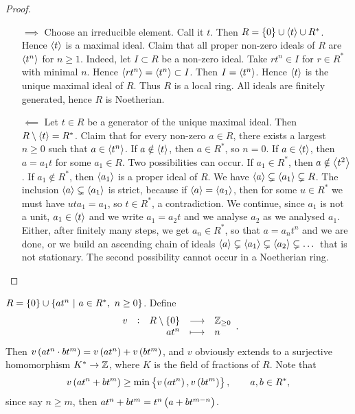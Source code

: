 \begin{proof}
\hfill
\begin{itemize}
\item[$ \implies $] Choose an irreducible element. Call it $ t $. Then $ R = \cbr{0} \cup \abr{t} \cup R^* $. Hence $ \left\langle t \right\rangle $ is a maximal ideal. Claim that all proper non-zero ideals of $ R $ are $ \left\langle t^n \right\rangle $ for $ n \ge 1 $. Indeed, let $ I \subset R $ be a non-zero ideal. Take $ rt^n \in I $ for $ r \in R^* $ with minimal $ n $. Hence $ \left\langle rt^n \right\rangle = \left\langle t^n \right\rangle \subset I $. Then $ I = \left\langle t^n \right\rangle $. Hence $ \left\langle t \right\rangle $ is the unique maximal ideal of $ R $. Thus $ R $ is a local ring. All ideals are finitely generated, hence $ R $ is Noetherian.


\item[$ \impliedby $] Let $ t \in R $ be a generator of the unique maximal ideal. Then $ R \setminus \left\langle t \right\rangle = R^* $. Claim that for every non-zero $ a \in R $, there exists a largest $ n \ge 0 $ such that $ a \in \left\langle t^n \right\rangle $. If $ a \notin \left\langle t \right\rangle $, then $ a \in R^* $, so $ n = 0 $. If $ a \in \left\langle t \right\rangle $, then $ a = a_1t $ for some $ a_1 \in R $. Two possibilities can occur. If $ a_1 \in R^* $, then $ a \notin \left\langle t^2 \right\rangle $. If $ a_1 \notin R^* $, then $ \left\langle a_1 \right\rangle $ is a proper ideal of $ R $. We have $ \left\langle a \right\rangle \subsetneq \left\langle a_1 \right\rangle \subsetneq R $. The inclusion $ \left\langle a \right\rangle \subsetneq \left\langle a_1 \right\rangle $ is strict, because if $ \left\langle a \right\rangle = \left\langle a_1 \right\rangle $, then for some $ u \in R^* $ we must have $ uta_1 = a_1 $, so $ t \in R^* $, a contradiction. We continue, since $ a_1 $ is not a unit, $ a_1 \in \left\langle t \right\rangle $ and we write $ a_1 = a_2t $ and we analyse $ a_2 $ as we analysed $ a_1 $. Either, after finitely many steps, we get $ a_n \in R^* $, so that $ a = a_nt^n $ and we are done, or we build an ascending chain of ideals $ \left\langle a \right\rangle \subsetneq \left\langle a_1 \right\rangle \subsetneq \left\langle a_2 \right\rangle \subsetneq \dots $ that is not stationary. The second possibility cannot occur in a Noetherian ring.
\end{itemize}
\end{proof}

\begin{remark*}
$ R = \cbr{0} \cup \cbr{at^n \st a \in R^*, \ n \ge 0} $. Define
$$ \function[v]{R \setminus \cbr{0}}{\ZZ_{\ge 0}}{at^n}{n}. $$
Then $ v\br{at^n \cdot bt^m} = v\br{at^n} + v\br{bt^m} $, and $ v $ obviously extends to a surjective homomorphism $ K^* \to \mathbb{Z} $, where $ K $ is the field of fractions of $ R $. Note that
$$ v\br{at^n + bt^m} \ge \min\cbr{v\br{at^n}, v\br{bt^m}}, \qquad a, b \in R^*, $$
since say $ n \ge m $, then $ at^n + bt^m = t^n\br{a + bt^{m - n}} $.
\end{remark*}

